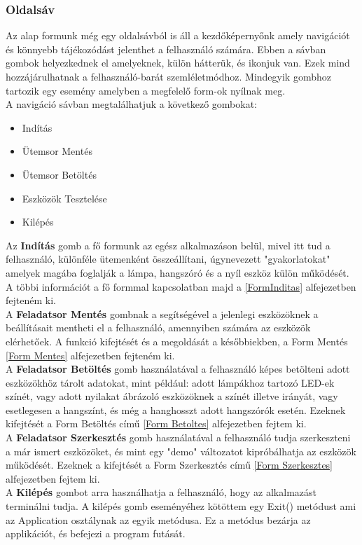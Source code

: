 \documentclass[tocnopagenum]{thesis-ekf}
\theoremstyle{definition}
\theoremstyle{remark}
\begin{document}
	\subsubsection{Oldalsáv}
	Az alap formunk még egy oldalsávból is áll a kezdőképernyőnk amely navigációt és könnyebb tájékozódást jelenthet a felhasználó számára.
	Ebben a sávban gombok helyezkednek el amelyeknek, külön hátterük, és ikonjuk van. Ezek mind hozzájárulhatnak a felhasználó-barát szemléletmódhoz. Mindegyik gombhoz tartozik egy esemény amelyben a megfelelő form-ok nyílnak meg.
	\\
	A navigáció sávban megtalálhatjuk a következő gombokat:
	\begin{itemize}
		\item Indítás
		\item Ütemsor Mentés
		\item Ütemsor Betöltés
		\item Eszközök Tesztelése
		\item Kilépés
	\end{itemize}
	Az \textbf{Indítás} gomb a fő formunk az egész alkalmazáson belül, mivel itt tud a felhasználó, különféle ütemenként összeállítani, úgynevezett "gyakorlatokat" amelyek magába foglalják a lámpa, hangszóró és a nyíl eszköz külön működését. A többi információt a fő formmal kapcsolatban majd a \ref{FormInditas} alfejezetben fejteném ki.
	\\
	A  \textbf{Feladatsor Mentés} gombnak a segítségével a jelenlegi eszközöknek a beállításait mentheti el a felhasználó, amennyiben számára az eszközök elérhetőek. A funkció kifejtését és a megoldását a későbbiekben, a Form Mentés \ref{Form Mentes} alfejezetben fejteném ki.
	\\
	A \textbf{Feladatsor Betöltés} gomb használatával a felhasználó képes betölteni adott eszközökhöz tárolt adatokat, mint például: adott lámpákhoz tartozó LED-ek színét, vagy adott nyilakat ábrázoló eszközöknek a színét illetve irányát, vagy esetlegesen a hangszínt, és még a hanghosszt adott hangszórók esetén.	Ezeknek kifejtését a Form Betöltés című \ref{Form Betoltes}
	alfejezetben fejtem ki.
	\\
	A \textbf{Feladatsor Szerkesztés} gomb használatával a felhasználó tudja szerkeszteni a már ismert eszközöket, és mint egy "demo" változatot kipróbálhatja az eszközök működését. Ezeknek a kifejtését a Form Szerkesztés című \ref{Form Szerkesztes}	alfejezetben fejtem ki.
	\\
	A \textbf{Kilépés} gombot arra használhatja a felhasználó, hogy az alkalmazást terminálni tudja. A kilépés gomb eseményéhez kötöttem egy Exit() metódust ami az Application osztálynak az egyik metódusa. Ez a metódus bezárja az applikációt, és befejezi a program futását. 
	\\ 
\end{document}
